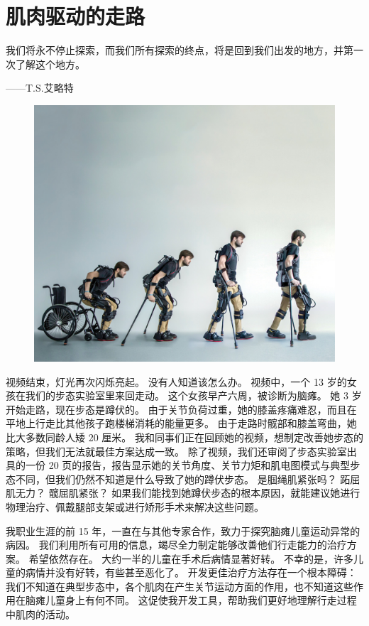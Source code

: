 \chapter{肌肉驱动的走路} \label{chap:chap11}

我们将永不停止探索，而我们所有探索的终点，将是回到我们出发的地方，并第一次了解这个地方。
\begin{flushright}
	——T.S.艾略特
\end{flushright}


\begin{figure}[!htb]
	\centering
	\includegraphics[width=1.0\linewidth]{chap11/11_0}
	\caption*{ \label{fig:11_0}}
\end{figure}


视频结束，灯光再次闪烁亮起。
没有人知道该怎么办。
视频中，一个 13 岁的女孩在我们的步态实验室里来回走动。
这个女孩早产六周，被诊断为脑瘫。
她 3 岁开始走路，现在步态是蹲伏的。
由于关节负荷过重，她的膝盖疼痛难忍，而且在平地上行走比其他孩子跑楼梯消耗的能量更多。
由于走路时髋部和膝盖弯曲，她比大多数同龄人矮 20 厘米。
我和同事们正在回顾她的视频，想制定改善她步态的策略，但我们无法就最佳方案达成一致。
除了视频，我们还审阅了步态实验室出具的一份 20 页的报告，报告显示她的关节角度、关节力矩和肌电图模式与典型步态不同，但我们仍然不知道是什么导致了她的蹲伏步态。
是腘绳肌紧张吗？
跖屈肌无力？
髋屈肌紧张？
如果我们能找到她蹲伏步态的根本原因，就能建议她进行物理治疗、佩戴腿部支架或进行矫形手术来解决这些问题。


我职业生涯的前 15 年，一直在与其他专家合作，致力于探究脑瘫儿童运动异常的病因。
我们利用所有可用的信息，竭尽全力制定能够改善他们行走能力的治疗方案。
希望依然存在。
大约一半的儿童在手术后病情显著好转。
不幸的是，许多儿童的病情并没有好转，有些甚至恶化了。
开发更佳治疗方法存在一个根本障碍：我们不知道在典型步态中，各个肌肉在产生关节运动方面的作用，也不知道这些作用在脑瘫儿童身上有何不同。
这促使我开发工具，帮助我们更好地理解行走过程中肌肉的活动。


